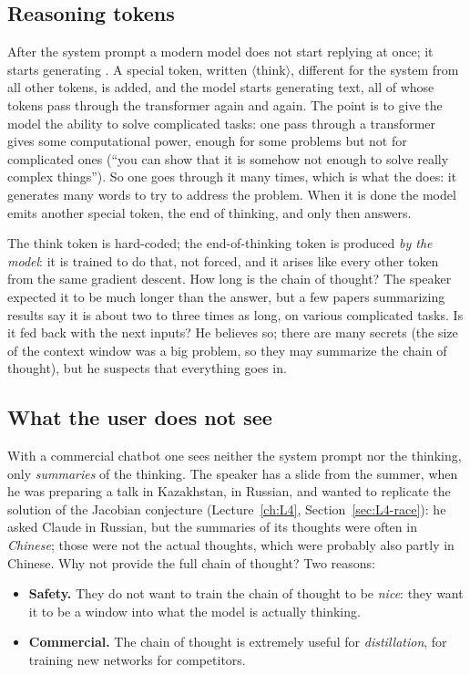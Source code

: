 \subsection{Reasoning tokens}\label{sec:L6-reasoning}
After the system prompt a modern model does not start replying at once; it starts generating . A special token, written $\langle$think$\rangle$, different for the system from all other tokens, is added, and the model starts generating text, all of whose tokens pass through the transformer again and again. The point is to give the model the ability to solve complicated tasks: one pass through a transformer gives some computational power, enough for some problems but not for complicated ones (``you can show that it is somehow not enough to solve really complex things''). So one goes through it many times, which is what the  does: it generates many words to try to address the problem. When it is done the model emits another special token, the end of thinking, and only then answers.

The think token is hard-coded; the end-of-thinking token is produced \emph{by the model}: it is trained to do that, not forced, and it arises like every other token from the same gradient descent. How long is the chain of thought? The speaker expected it to be much longer than the answer, but a few papers summarizing results say it is about two to three times as long, on various complicated tasks. Is it fed back with the next inputs? He believes so; there are many secrets (the size of the context window was a big problem, so they may summarize the chain of thought), but he suspects that everything goes in.

\subsection{What the user does not see}\label{sec:L6-hidden}
With a commercial chatbot one sees neither the system prompt nor the thinking, only \emph{summaries} of the thinking. The speaker has a slide from the summer, when he was preparing a talk in Kazakhstan, in Russian, and wanted to replicate the solution of the Jacobian conjecture (Lecture~\ref{ch:L4}, Section~\ref{sec:L4-race}): he asked Claude in Russian, but the summaries of its thoughts were often in \emph{Chinese}; those were not the actual thoughts, which were probably also partly in Chinese. Why not provide the full chain of thought? Two reasons:
\begin{itemize}
  \item \textbf{Safety.} They do not want to train the chain of thought to be \emph{nice}: they want it to be a window into what the model is actually thinking.
  \item \textbf{Commercial.} The chain of thought is extremely useful for \emph{distillation}, for training new networks for competitors.
\end{itemize}

